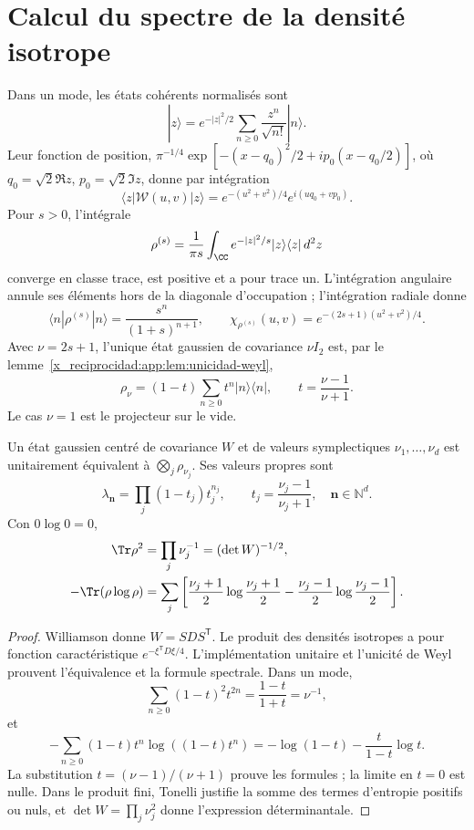 \section{Calcul du spectre de la densité isotrope}
Dans un mode, les états cohérents normalisés sont
\[
 |z\rangle=e^{-|z|^2/2}\sum_{n\geq0}\frac{z^n}{\sqrt{n!}}|n\rangle.
\]
Leur fonction de position,
\(\pi^{-1/4}\exp[-(x-q_0)^2/2+ip_0(x-q_0/2)]\), où
\(q_0=\sqrt2\Re z\), \(p_0=\sqrt2\Im z\), donne par intégration
\[
 \langle z|\mathcal W(u,v)|z\rangle
 =e^{-(u^2+v^2)/4}e^{i(uq_0+vp_0)}.
\]
Pour \(s>0\), l’intégrale
\[
 \rho^{(s)}=\frac1{\pi s}\int_{\CC} e^{-|z|^2/s}
 |z\rangle\langle z|\,d^2z
\]
converge en classe trace, est positive et a pour trace un. L’intégration
angulaire annule ses éléments hors de la diagonale d’occupation ; l’intégration
radiale donne
\[
 \langle n|\rho^{(s)}|n\rangle=\frac{s^n}{(1+s)^{n+1}},\qquad
 \chi_{\rho^{(s)}}(u,v)=e^{-(2s+1)(u^2+v^2)/4}.
\]
Avec \(\nu=2s+1\), l’unique état gaussien de covariance
\(\nu I_2\) est, par le lemme~\ref{x_reciprocidad:app:lem:unicidad-weyl},
\begin{equation}
 \rho_\nu=(1-t)\sum_{n\geq0}t^n|n\rangle\langle n|,
 \qquad t=\frac{\nu-1}{\nu+1}.
 \label{x_reciprocidad:app:eq:estado-geometrico}
\end{equation}
Le cas \(\nu=1\) est le projecteur sur le vide.

\begin{theorem}
\label{x_reciprocidad:app:thm:espectro-gaussiano}
Un état gaussien centré de covariance \(W\) et de valeurs
symplectiques \(\nu_1,\ldots,\nu_d\) est unitairement équivalent
à \(\bigotimes_j\rho_{\nu_j}\). Ses valeurs propres sont
\[
 \lambda_{\symbf{n}}=\prod_j(1-t_j)t_j^{n_j},\qquad
 t_j=\frac{\nu_j-1}{\nu_j+1},\quad \symbf{n}\in\mathbb N^d.
\]
Con \(0\log0=0\),
\begin{align}
 \Tr\rho^2&=\prod_j\nu_j^{-1}=(\det W)^{-1/2},
 \label{x_reciprocidad:app:eq:pureza-general}\\
 -\Tr(\rho\log\rho)&=\sum_j
 \left[\frac{\nu_j+1}{2}\log\frac{\nu_j+1}{2}
 -\frac{\nu_j-1}{2}\log\frac{\nu_j-1}{2}\right].
 \label{x_reciprocidad:app:eq:entropia-general}
\end{align}
\end{theorem}
\begin{proof}
Williamson donne \(W=SDS^{\mathsf T}\). Le produit des densités
isotropes a pour fonction caractéristique \(e^{-\xi^{\mathsf T}D\xi/4}\).
L’implémentation unitaire et l’unicité de Weyl prouvent
l’équivalence et la formule spectrale. Dans un mode,
\[
 \sum_{n\geq0}(1-t)^2t^{2n}=\frac{1-t}{1+t}=\nu^{-1},
\]
et
\[
 -\sum_{n\geq0}(1-t)t^n\log((1-t)t^n)
 =-\log(1-t)-\frac{t}{1-t}\log t.
\]
La substitution \(t=(\nu-1)/(\nu+1)\) prouve les formules ; la
limite en \(t=0\) est nulle. Dans le produit fini, Tonelli justifie
la somme des termes d’entropie positifs ou nuls, et
\(\det W=\prod_j\nu_j^2\) donne l’expression déterminantale.
\end{proof}

